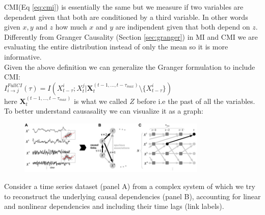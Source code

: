 CMI(Eq \ref{eq:cmi}) is essentially the same but we measure if two variables are dependent given that both are conditioned by a third variable.
In other words given $x,y \text{ and } z$ how much $x$ and $y$ are indipendent given that both depend on $z$.
Differently from Granger Causality (Section \ref{sec:granger}) in MI and CMI 
we are evaluating the entire distribution instead of only the mean so it is 
more informative.\\
Given the above definition we can generalize the Granger formulation to include CMI:\\
$I^{FullCI}_{i\rightarrow j}(\tau)=I(X^i_{t-\tau};X^j_t|\bm{X}_t^{(t-1,\ldots,t-\tau_{max})}\setminus\{X^i_{t-\tau}\})$ 
\\here $\bm{X}_t^{(t-1,\ldots,t-\tau_{max})}$ is what we called $Z$ before i.e the past of all the variables.\\

To better understand causasality we can visualize it as a graph:
\begin{figure}[H]
    \centering
    \includegraphics[width=0.8\textwidth]{img/visualization.jpeg}
\end{figure}
Consider a time series dataset (panel A) from a complex system of which we try to reconstruct the underlying causal dependencies (panel B), 
accounting for linear and nonlinear dependencies and including their time lags (link labels). 

